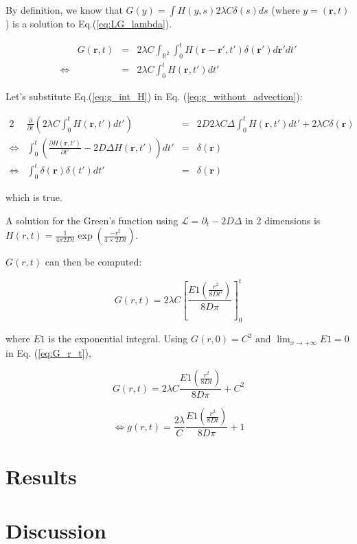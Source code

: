 By definition, we know that $G(y)=\int H(y,s)2\lambda C\delta(s)ds$
(where $y=(\boldsymbol{r},t)$) is a solution to Eq.(\ref{eq:LG_lambda}).

\begin{align}
 & G(\boldsymbol{r},t) & = & 2\lambda C\int_{\mathbb{R}^{2}}\int_{0}^{t}H(\boldsymbol{r}-\boldsymbol{r'},t')\delta(\boldsymbol{r'})d\boldsymbol{r}'dt'\nonumber \\
\Leftrightarrow &  & = & 2\lambda C\int_{0}^{t}H(\boldsymbol{r},t')dt'\label{eq:g_int_H}
\end{align}

Let's substitute Eq.(\ref{eq:g_int_H}) in Eq. (\ref{eq:g_without_advection}):

\begin{alignat*}{2}
 & \frac{\partial}{\partial t}\left(2\lambda C\int_{0}^{t}H(\boldsymbol{r},t')dt'\right) & = & 2D2\lambda C\Delta\int_{0}^{t}H(\boldsymbol{r},t')dt'+2\lambda C\delta(\boldsymbol{r})\\
\Leftrightarrow & \int_{0}^{t}\left(\frac{\partial H(\boldsymbol{r},t')}{\partial t'}-2D\Delta H(\boldsymbol{r},t')\right)dt' & = & \delta(\boldsymbol{r})\\
\Leftrightarrow & \int_{0}^{t}\delta(\boldsymbol{r})\delta(t')dt' & = & \delta(\boldsymbol{r})
\end{alignat*}

which is true. 

A solution for the Green's function using $\mathcal{L}=\partial_{t}-2D\Delta$
in 2 dimensions is $H(r,t)=\frac{1}{4\pi2Dt}\exp(\frac{-r^{2}}{4\times2Dt})$. 

$G(r,t)$ can then be computed:

\begin{equation}
G(r,t)=2\lambda C\left[\frac{E1\left(\frac{r^{2}}{8Dt'}\right)}{8D\pi}\right]_{0}^{t}\label{eq:G_r_t}
\end{equation}

where $E1$ is the exponential integral. Using $G(r,0)=C^{2}$ and
$\lim_{x\rightarrow+\infty}E1=0$ in Eq. (\ref{eq:G_r_t}), 

\begin{equation}
G(r,t)=2\lambda C\frac{E1\left(\frac{r^{2}}{8Dt}\right)}{8D\pi}+C^{2}
\end{equation}

\begin{equation}
\Leftrightarrow g(r,t)=\frac{2\lambda}{C}\frac{E1\left(\frac{r^{2}}{8Dt}\right)}{8D\pi}+1
\end{equation}

\section*{Results}

\section*{Discussion}


